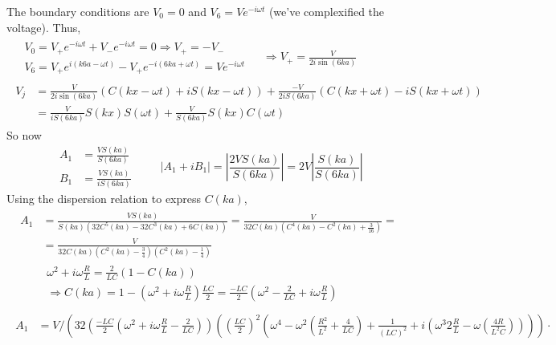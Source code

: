 \documentclass[twoside,10pt]{amsart}
\begin{document}
\begin{enumerate}
The boundary conditions are $V_0 = 0$ and $V_6 = V e^{ -i \omega t}$ (we've complexified the voltage).  Thus,
\[
\begin{gathered}
\begin{aligned}
  & V_0 = V_+ e^{-i \omega t} + V_- e^{- i \omega t} = 0 \Longrightarrow V_+ = - V_- \\
  & V_6 = V_+ e^{i (k6a - \omega t) } - V_+ e^{-i (6ka + \omega t) } = Ve^{ -i \omega t} 
\end{aligned} \quad \, \Longrightarrow V_+ = \frac{V}{ 2 i \sin{(6ka) }} \\
\begin{aligned}
  V_j & = \frac{V}{ 2 i \sin{ (6ka) } } ( C(kx - \omega t) + i S(kx - \omega t) ) + \frac{ - V}{ 2 i S(6ka) } (C(kx+\omega t) - i S(kx + \omega t ) ) \\
  & = \frac{V}{ i S(6ka)} S(kx) S(\omega t) + \frac{V}{ S(6ka) } S(kx)C(\omega t )
\end{aligned}
\end{gathered}
\]
So now
\[
\begin{aligned}
  A_1 &  = \frac{V S(ka) }{ S(6ka) } \\
  B_1 & = \frac{ V S(ka) }{ i S(6ka) } 
\end{aligned} \quad \quad \, |A_1 + i B_1 | = \left| \frac{ 2 V S(ka) }{ S(6ka) } \right| = 2V \left| \frac{S(ka)}{S(6ka)} \right|
\]
Using the dispersion relation to express $C(ka)$,
\[
\begin{gathered}
  \begin{aligned}
    A_1 & = \frac{V S(ka)}{ S(ka) (32C^5(ka) - 32 C^3(ka) + 6C(ka) ) } = \frac{V}{ 32 C(ka)(C^4(ka) - C^2(ka) + \frac{3}{16} ) } = \\
    & = \frac{V}{ 32 C(ka)(C^2(ka) - \frac{3}{4} )( C^2(ka) - \frac{1}{4} ) }  \\
    & \begin{gathered}
      \omega^2 + i \omega \frac{R}{L} = \frac{2}{LC} (1- C(ka)) \\
      \Longrightarrow C(ka) = 1 - (\omega^2 + i \omega \frac{R}{L} ) \frac{LC}{2} = \frac{-LC}{2} ( \omega^2 - \frac{2}{LC} + i \omega \frac{R}{L} )
\end{gathered}     
\end{aligned}
\end{gathered}
\]
\[
\begin{gathered}
\begin{aligned}
    A_1    & = V/ \left( 32 ( \frac{-LC}{2} (\omega^2 + i \omega \frac{R}{L} - \frac{2}{LC} ) )( \left( \frac{LC}{2} \right)^2 ( \omega^4 - \omega^2 \left( \frac{R^2}{L^2} + \frac{4}{LC} \right) + \frac{1}{(LC)^2} + i \left( \omega^3 2 \frac{R}{L} - \omega \left( \frac{4 R}{L^2 C} \right) \right) ) ) \cdot \right. \\

\end{aligned}
\end{gathered}\]
\end{enumerate}
\end{document}
